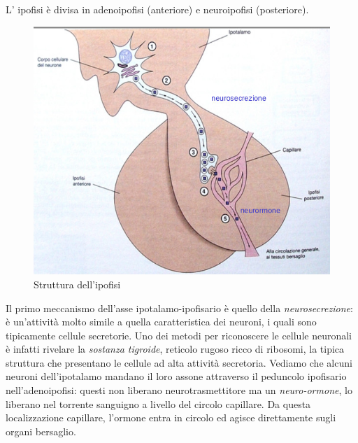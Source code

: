 \documentclass[a4paper,12pt]{article}
\begin{document}
L' ipofisi è divisa in adenoipofisi (anteriore) e neuroipofisi (posteriore).
\begin{figure}[H]
\centering
\includegraphics[scale=0.35]{immagine/ipofisi.jpg}
\caption{Struttura dell'ipofisi}
\end{figure}

Il primo meccanismo dell'asse ipotalamo-ipofisario è quello della \emph{neurosecrezione}: è un'attività molto simile a quella caratteristica dei neuroni, i quali sono tipicamente cellule secretorie. Uno dei metodi per riconoscere le cellule neuronali è infatti rivelare la \emph{sostanza tigroide}, reticolo rugoso ricco di ribosomi, la tipica struttura che presentano le cellule ad alta attività secretoria. Vediamo che alcuni neuroni dell'ipotalamo mandano il loro assone attraverso il peduncolo ipofisario nell'adenoipofisi: questi non liberano neurotrasmettitore ma un \emph{neuro-ormone}, lo liberano nel torrente sanguigno a livello del circolo capillare. Da questa localizzazione capillare, l'ormone entra in circolo ed agisce direttamente sugli organi bersaglio.
\end{document}
